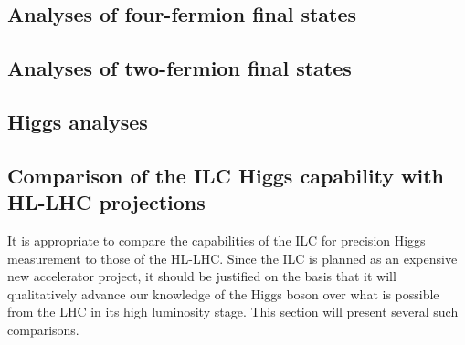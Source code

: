 

\subsection{Analyses of four-fermion final states} 


\subsection{Analyses of two-fermion final states}


\subsection{Higgs analyses}



\subsection{Comparison of the ILC Higgs capability with 
HL-LHC projections}

It is appropriate to compare the capabilities of the ILC for precision
Higgs measurement to those of the HL-LHC.  Since the ILC is planned as
an expensive new accelerator project, it should be justified on the
basis that it will qualitatively advance our knowledge of the Higgs
boson over what is possible from the LHC in its high luminosity stage.  
This section will present several such comparisons.

